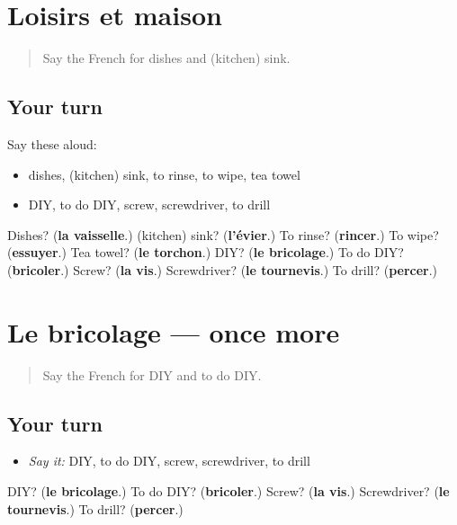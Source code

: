 \section[(dialogue)]{Loisirs et maison}

\label{lesson:FR-R531-revision-530-531}



\begin{quote}
Say the French for dishes and (kitchen) sink.
\end{quote}

\subsection*{Your turn}
Say these aloud:

\begin{itemize}
\raggedright
  \item dishes, (kitchen) sink, to rinse, to wipe, tea towel
  \item DIY, to do DIY, screw, screwdriver, to drill
\end{itemize}

\begin{tcolorbox}[breakable,colback=teal!4,colframe=teal!35!black,title={Before you move on}]
Dishes? (\textbf{la vaisselle}.) (kitchen) sink? (\textbf{l'évier}.) To rinse? (\textbf{rincer}.) To wipe? (\textbf{essuyer}.) Tea towel? (\textbf{le torchon}.) DIY? (\textbf{le bricolage}.) To do DIY? (\textbf{bricoler}.) Screw? (\textbf{la vis}.) Screwdriver? (\textbf{le tournevis}.) To drill? (\textbf{percer}.)
\end{tcolorbox}
\section[(dialogue)]{Le bricolage — once more}

\label{lesson:FR-R531-revision-final-531}



\begin{quote}
Say the French for DIY and to do DIY.
\end{quote}

\subsection*{Your turn}
\begin{itemize}
\raggedright
  \item \emph{Say it:} DIY, to do DIY, screw, screwdriver, to drill
\end{itemize}

\begin{tcolorbox}[breakable,colback=teal!4,colframe=teal!35!black,title={Before you move on}]
DIY? (\textbf{le bricolage}.) To do DIY? (\textbf{bricoler}.) Screw? (\textbf{la vis}.) Screwdriver? (\textbf{le tournevis}.) To drill? (\textbf{percer}.)
\end{tcolorbox}
